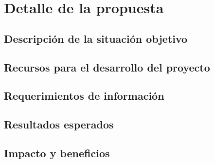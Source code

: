 \section{Detalle de la propuesta}
\label{section:propuesta}

\Blindtext[3]

\subsection{Descripción de la situación objetivo}
\label{subection:prop:situacion-objetivo}

\Blindtext[3]

\subsection{Recursos para el desarrollo del proyecto}
\label{subsection:prop:recursos}

\Blindtext[1]

\subsection{Requerimientos de información}
\label{subsection:prop:info}

\Blindtext[2]

\subsection{Resultados esperados}
\label{subsection:prop:resultados}

\Blindtext[3]

\subsection{Impacto y beneficios}
\label{subsection:prop:impacto}

\Blindtext[4]
